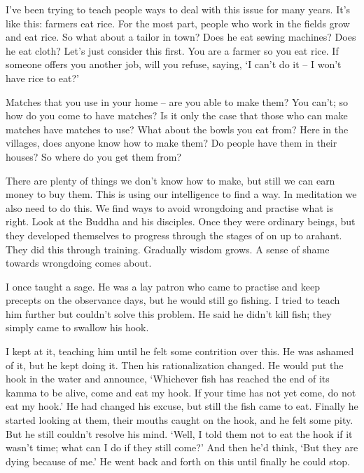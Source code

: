 I've been trying to teach people ways to deal with this issue for many years. It's like this: farmers eat rice. For the most part, people who work in the fields grow and eat rice. So what about a tailor in town? Does he eat sewing machines? Does he eat cloth? Let's just consider this first. You are a farmer so you eat rice. If someone offers you another job, will you refuse, saying, `I can't do it -- I won't have rice to eat?' 

Matches that you use in your home -- are you able to make them? You can't; so how do you come to have matches? Is it only the case that those who can make matches have matches to use? What about the bowls you eat from? Here in the villages, does anyone know how to make them? Do people have them in their houses? So where do you get them from? 

There are plenty of things we don't know how to make, but still we can earn money to buy them. This is using our intelligence to find a way. In meditation we also need to do this. We find ways to avoid wrongdoing and practise what is right. Look at the Buddha and his disciples. Once they were ordinary beings, but they developed themselves to progress through the stages of  on up to arahant. They did this through training. Gradually wisdom grows. A sense of shame towards wrongdoing comes about. 

I once taught a sage. He was a lay patron who came to practise and keep precepts on the observance days, but he would still go fishing. I tried to teach him further but couldn't solve this problem. He said he didn't kill fish; they simply came to swallow his hook. 

I kept at it, teaching him until he felt some contrition over this. He was ashamed of it, but he kept doing it. Then his rationalization changed. He would put the hook in the water and announce, `Whichever fish has reached the end of its kamma to be alive, come and eat my hook. If your time has not yet come, do not eat my hook.' He had changed his excuse, but still the fish came to eat. Finally he started looking at them, their mouths caught on the hook, and he felt some pity. But he still couldn't resolve his mind. `Well, I told them not to eat the hook if it wasn't time; what can I do if they still come?' And then he'd think, `But they are dying because of me.' He went back and forth on this until finally he could stop. 

